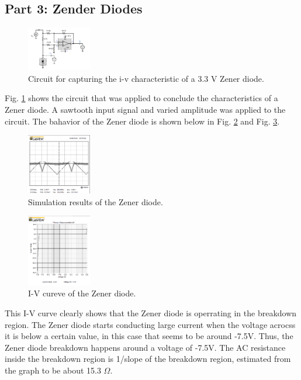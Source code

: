 \documentclass[letterpaper, 10 pt, conference]{ieeeconf}  %
\begin{document}
    \subsection{Part 3: Zender Diodes}
    \begin{figure}[h]
      \centering
        \includegraphics[width=0.25\textwidth]{images/zener_circuit.png}
      \caption{Circuit for capturing the i-v characteristic of a 3.3 V Zener diode.}
      \label{fig:zener_1}
    \end{figure}
    Fig. \ref{fig:zener_1} shows the circuit that was applied to conclude the characteristics of
    a Zener diode. A sawtooth input signal and varied amplitude was applied to the circuit. The bahavior
    of the Zener diode is shown below in Fig. \ref{fig:zener_2} and Fig. \ref{fig:zener_3}.
    \begin{figure}[h]
      \centering
        \includegraphics[width=0.25\textwidth]{images/zener_simu.png}
      \caption{Simulation results of the Zener diode.}
      \label{fig:zener_2}
    \end{figure}
    \begin{figure}[h]
      \centering
        \includegraphics[width=0.25\textwidth]{images/zener_iv.png}
      \caption{I-V cureve of the Zener diode.}
      \label{fig:zener_3}
    \end{figure}
    This I-V curve clearly shows that the Zener diode is operrating in the breakdown region.
    The Zener diode starts conducting large current when the voltage acrocss it is below
    a certain value, in this case that seems to be around -7.5V.
    Thus, the Zener diode breakdown happens around a voltage of -7.5V.
    The AC resistance inside the breakdown region is 1/slope of the breakdown region, estimated from
    the graph to be about 15.3 $\Omega$.
\end{document}
